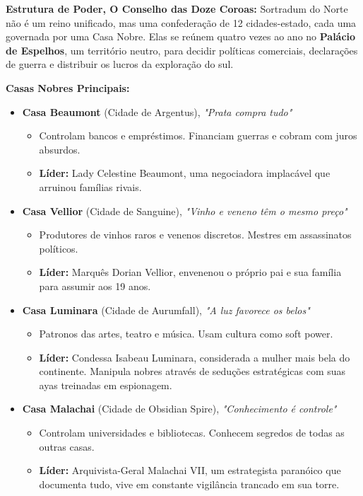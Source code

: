 \textbf{\ringmfamily Estrutura de Poder, O Conselho das Doze Coroas:}
Sortradum do Norte não é um reino unificado, mas uma confederação de 12 cidades-estado, cada uma governada por uma Casa Nobre. Elas se reúnem quatro vezes ao ano no \textbf{Palácio de Espelhos}, um território neutro, para decidir políticas comerciais, declarações de guerra e distribuir os lucros da exploração do sul.

\textbf{\ringmfamily Casas Nobres Principais:}
\begin{itemize}
    \item \textbf{\ringmfamily Casa Beaumont} (Cidade de Argentus), \textit{"Prata compra tudo"}
    \begin{itemize}
        \item Controlam bancos e empréstimos. Financiam guerras e cobram com juros absurdos.
        \item \textbf{\ringmfamily Líder:} Lady Celestine Beaumont, uma negociadora implacável que arruinou famílias rivais.
    \end{itemize}
    \item \textbf{\ringmfamily Casa Vellior} (Cidade de Sanguine), \textit{"Vinho e veneno têm o mesmo preço"}
    \begin{itemize}
        \item Produtores de vinhos raros e venenos discretos. Mestres em assassinatos políticos.
        \item \textbf{\ringmfamily Líder:} Marquês Dorian Vellior, envenenou o próprio pai e sua família para assumir aos 19 anos.
    \end{itemize}
    \item \textbf{\ringmfamily Casa Luminara} (Cidade de Aurumfall), \textit{"A luz favorece os belos"}
    \begin{itemize}
        \item Patronos das artes, teatro e música. Usam cultura como soft power.
        \item \textbf{\ringmfamily Líder:} Condessa Isabeau Luminara, considerada a mulher mais bela do continente. Manipula nobres através de seduções estratégicas com suas ayas treinadas em espionagem.
    \end{itemize}
    \item \textbf{\ringmfamily Casa Malachai} (Cidade de Obsidian Spire), \textit{"Conhecimento é controle"}
    \begin{itemize}
        \item Controlam universidades e bibliotecas. Conhecem segredos de todas as outras casas.
        \item \textbf{\ringmfamily Líder:} Arquivista-Geral Malachai VII, um estrategista paranóico que documenta tudo, vive em constante vigilância trancado em sua torre.
    \end{itemize}


\end{itemize}
